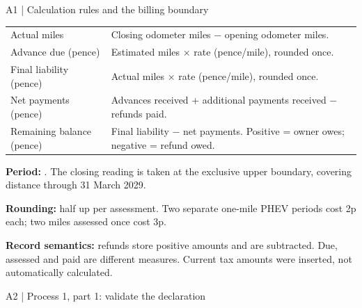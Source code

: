 \begin{frame}{A1 | Calculation rules and the billing boundary}
\small
\begin{tabularx}{\textwidth}{@{}p{}X@{}}\toprule
Actual miles & Closing odometer miles − opening odometer miles.\\
Advance due (pence) & Estimated miles × rate (pence/mile), rounded once.\\
Final liability (pence) & Actual miles × rate (pence/mile), rounded once.\\
Net payments (pence) & Advances received + additional payments received − refunds paid.\\
Remaining balance (pence) & Final liability − net payments. Positive = owner owes; negative = refund owed.\\\bottomrule
\end{tabularx}\par
\medskip
\textbf{Period:} \code{[2028-04-01, 2029-04-01)}. The closing reading is taken at the exclusive upper boundary, covering distance through 31 March 2029.
\par\smallskip
\textbf{Rounding:} half up per assessment. Two separate one-mile PHEV periods cost 2p each; two miles assessed once cost 3p.
\par\smallskip
\textbf{Record semantics:} refunds store positive amounts and are subtracted. Due, assessed and paid are different measures. Current tax amounts were inserted, not automatically calculated.
\end{frame}

\begin{frame}{A2 | Process 1, part 1: validate the declaration}
\begin{center}\end{center}
\epclegend
{}
\end{frame}


